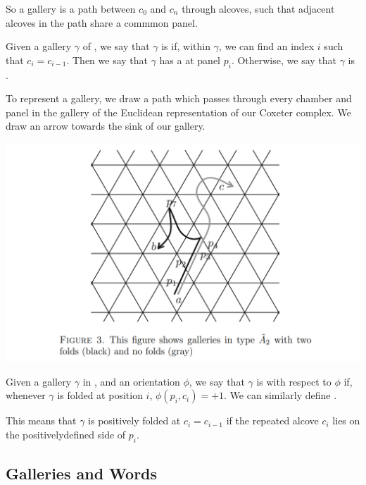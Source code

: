 \documentclass[12pt]{article}
\begin{document}
So a gallery is a path between $c_0$ and $c_n$ through alcoves, such that adjacent alcoves in the path share a commmon panel. 

\begin{definition}
    Given a gallery $\gamma$ of \sg, we say that $\gamma$ is  if, within $\gamma$, we can find an index $i$ such that $c_i=c_{i-1}$. Then we say that $\gamma$ has a  at panel $p_i$. Otherwise, we say that $\gamma$ is .  
\end{definition}

To represent a gallery, we draw a path which passes through every chamber and panel in the gallery of the Euclidean representation of our Coxeter complex. We draw an arrow towards the sink of our gallery. 

\includegraphics[scale=0.6]{Screenshot 2023-02-03 111653.png}\\

\begin{definition}
    Given a gallery $\gamma$ in \sg, and an orientation $\phi$, we say that $\gamma$ is  with respect to $\phi$ if, whenever $\gamma$ is folded at position $i$, $\phi(p_i,c_i)=+1$.  We can similarly define .
\end{definition}

This means that $\gamma$ is positively folded at $c_i=c_{i-1}$ if the repeated alcove $c_i$ lies on the positivelydefined side of $p_i$. 

\subsection{Galleries and Words}
\end{document}
